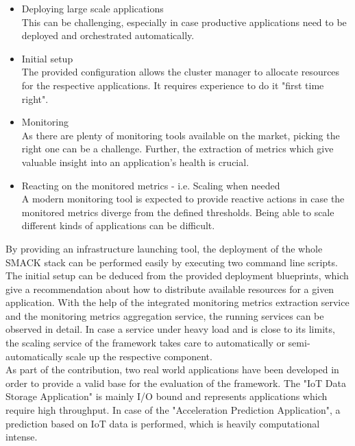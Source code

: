 \begin{itemize}
\item Deploying large scale applications\\
      This can be challenging, especially in case productive applications need to be deployed and orchestrated automatically.
\item Initial setup\\
      The provided configuration allows the cluster manager to allocate resources for the respective applications.
      It requires experience to do it "first time right".
\item Monitoring\\
      As there are plenty of monitoring tools available on the market, picking the right one can be a challenge.
      Further, the extraction of metrics which give valuable insight into an application's health is crucial.
\item Reacting on the monitored metrics - i.e. Scaling when needed\\
      A modern monitoring tool is expected to provide reactive actions in case the monitored metrics diverge from the defined thresholds.
      Being able to scale different kinds of applications can be difficult.
\end{itemize}

By providing an infrastructure launching tool, the deployment of the whole SMACK stack can be performed easily by executing two command line scripts.
The initial setup can be deduced from the provided deployment blueprints, which give a recommendation about how to distribute available resources for a given application.
With the help of the integrated monitoring metrics extraction service and the monitoring metrics aggregation service, the running services can be observed in detail.
In case a service under heavy load and is close to its limits, the scaling service of the framework takes care to automatically or semi-automatically scale up the respective component.\\

As part of the contribution, two real world applications have been developed in order to provide a valid base for the evaluation of the framework.
The "IoT Data Storage Application" is mainly I/O bound and represents applications which require high throughput.
In case of the "Acceleration Prediction Application", a prediction based on IoT data is performed, which is heavily computational intense.\\

